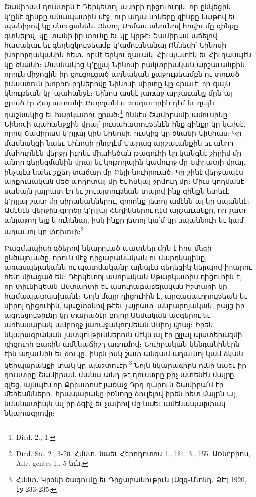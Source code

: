 \documentclass{article}
\begin{document}
{Շամիրամ դուստրն է Դերկետոյ ասորի դիցուհւոյն, որ ընկեցիկ կ՚ընէ զինքը անապատին մէջ, ուր աղաւնիները զինքը կաթով եւ պանիրով կը սնուցանեն։ Յետոյ Սիմաս անունով հովիւ մը զինքը գտնելով, կը տանի իր տունը եւ կը կրթէ։ Շամիրամ աճելով հասակաւ եւ գեղեցկութեամբ կ՚ամուսնանայ Ոննեսի՝ Նինոսի խորհրդականին հետ․ որմէ երկու զաւակ՝ Հիւպատէն եւ Հիւդասպէն կը ծնանի։ Մասնակից կ՚ըլլայ Նինոսի բակտրիական արշաւանքին, որուն միջոցին իր ցուցուցած առնական քաջութեամբն ու տուած իմաստուն խորհուրդներովը Նինոսի սիրտը կը գրաւէ, որ զայն կնութեան կը պահանջէ։ Նինոս ասկէ յառաջ արշաւանք մըն ալ ըրած էր Հայաստանի Բարզանէս թագաւորին դէմ եւ զայն դաշնակից եւ հարկատու ըրած։\footnote{Diod. 2., 1.} Ոննէս Շամիրամի ամուսինը Նինոսի պահանջքին վրայ՝ յուսահատութենէն ինք զինքը կը կախէ, որով Շամիրամ կ՚ըլլայ կին Նինոսի, ուսկից կը ծնանի Նինիաս։ Կը մասնակցի նաեւ Նինոսի ընդդէմ Մարաց արշաւանքին եւ անոր մահուընէն վերջը իբրեւ միահեծան թագուհի կը կանգնէ շիրիմ մը անոր գերեզմանին վրայ եւ կոթողային կամուրջ մը Եփրատի վրայ․ ինչպէս նաեւ շքեղ տաճար մը Բելի նուիրուած։ Կը շինէ վերջապէս արքունական մեծ պողոտայ մը եւ հսկայ ջրմուղ մը։ Միւս կողմանէ սակայն յայրատ էր եւ շուայտութեան տալով ինք զինքն ետեւէ կ՚ըլլայ շատ մը սիրականներու, զորոնք յետոյ ամէնն ալ կը սպաննէ։ Ամէնէն վերջին գործը կ՚ըլլայ Հնդիկներու դէմ արշաւանքը, որ շատ անյաջող ելք կ՚ունենայ, իսկ ինքը յետոյ կա՛մ կը սպաննուի եւ կամ աղաւնոյ կը փոխուի։\footnote{Diod. Sic. 2., 3֊20. Հմմտ․ նաեւ Հերոդոտոս 1., 184. 3., 155. Առնոբիոս, Adv. gentes 1., 5 եւն.}

Բազմապիսի գծերով նկարուած պատկեր մըն է հոս մեզի ընծայուածը, որուն մէջ դիցաբանական ու մարդկայինը, առասպելականն ու պատմականը այնպէս գեղեցիկ կերպով իրարու հետ միացած են։ Դերկետոյ ասորական Աթարկատիս դիցուհին է, որ փիւնիկեան Աստարտի եւ ասուրաբաբելական Իշտարի կը համապատասխանէ։ Նոյն մայր դիցուհին է, արգասաւորութեան եւ սիրոյ դիցուհին, պաշտօնով թէեւ յայրատ, անբարոյական, բայց իր ազդեցութիւնը կը տարածէր բոլոր Սեմական ազգերու եւ առհասարակ ամբողջ յառաջակողմեան Ասիոյ վրայ։ Իրեն նկարագրական յատկութիւններուն մէկն ալ էր ըլլալ պատերազմի դիցուհի բառին ամենաճիշդ առումով։ Նուիրական կենդանիներն էին աղաւնին եւ ձուկը․ ինքն իսկ շատ անգամ աղաւնոյ կամ ձկան կերպարանքի տակ կը պաշտուէր։\footnote{Հմմտ․ Կրօնի ծագումը եւ Դիցաբանութիւն (Ազգ֊Մտնդ․ ՁԷ) 1920, էջ 233֊235։} Նոյն նկարագիրն ունի նաեւ իր դուստրը Շամիրամ․ մանաւանդ թէ դուստրը քիչ ատենէն մայրը գլեց, այնպէս որ Քրիստոսէ յառաջ Դրդ դարուն Շամիրա՛մ էր մեհեաններու հրապարակը բռնողը ձուլելով իրեն հետ մայրն ալ, նմանատիպն ալ իր ձգիչ եւ չափով մը նաեւ ամենապարփակ նկարագրովը։

}
\end{document}
